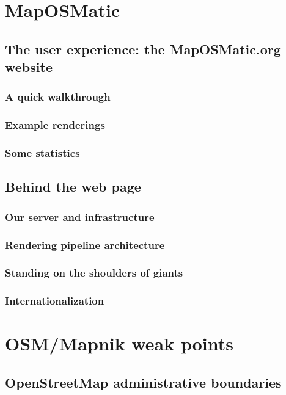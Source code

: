\documentclass{beamer}
\begin{document}
\section{MapOSMatic}
\subsection{The user experience: the MapOSMatic.org website}
\subsubsection{A quick walkthrough}
\subsubsection{Example renderings}
\subsubsection{Some statistics}

\subsection{Behind the web page}
\subsubsection{Our server and infrastructure}
\subsubsection{Rendering pipeline architecture}
\subsubsection{Standing on the shoulders of giants}
\subsubsection{Internationalization}

\section{OSM/Mapnik weak points}
\subsection{OpenStreetMap administrative boundaries}
\end{document}
